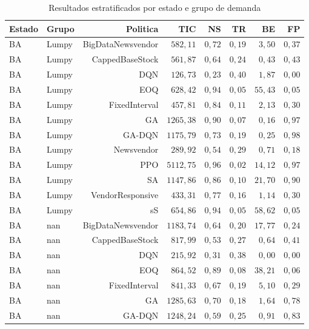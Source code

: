 \begin{table}[htb]
\centering
\caption{Resultados estratificados por estado e grupo de demanda}
\label{tab:kpis_stratified}
\begin{tabular}{llrrrrrr}
\toprule
Estado & Grupo & Politica & TIC & NS & TR & BE & FP \\
\midrule
BA & Lumpy & BigDataNewsvendor & $582{,}11$ & $0{,}72$ & $0{,}19$ & $3{,}50$ & $0{,}37$ \\
BA & Lumpy & CappedBaseStock & $561{,}87$ & $0{,}64$ & $0{,}24$ & $0{,}43$ & $0{,}43$ \\
BA & Lumpy & DQN & $126{,}73$ & $0{,}23$ & $0{,}40$ & $1{,}87$ & $0{,}00$ \\
BA & Lumpy & EOQ & $628{,}42$ & $0{,}94$ & $0{,}05$ & $55{,}43$ & $0{,}05$ \\
BA & Lumpy & FixedInterval & $457{,}81$ & $0{,}84$ & $0{,}11$ & $2{,}13$ & $0{,}30$ \\
BA & Lumpy & GA & $1265{,}38$ & $0{,}90$ & $0{,}07$ & $0{,}16$ & $0{,}97$ \\
BA & Lumpy & GA-DQN & $1175{,}79$ & $0{,}73$ & $0{,}19$ & $0{,}25$ & $0{,}98$ \\
BA & Lumpy & Newsvendor & $289{,}92$ & $0{,}54$ & $0{,}29$ & $0{,}71$ & $0{,}18$ \\
BA & Lumpy & PPO & $5112{,}75$ & $0{,}96$ & $0{,}02$ & $14{,}12$ & $0{,}97$ \\
BA & Lumpy & SA & $1147{,}86$ & $0{,}86$ & $0{,}10$ & $21{,}70$ & $0{,}90$ \\
BA & Lumpy & VendorResponsive & $433{,}31$ & $0{,}77$ & $0{,}16$ & $1{,}14$ & $0{,}30$ \\
BA & Lumpy & sS & $654{,}86$ & $0{,}94$ & $0{,}05$ & $58{,}62$ & $0{,}05$ \\
BA & nan & BigDataNewsvendor & $1183{,}74$ & $0{,}64$ & $0{,}20$ & $17{,}77$ & $0{,}24$ \\
BA & nan & CappedBaseStock & $817{,}99$ & $0{,}53$ & $0{,}27$ & $0{,}64$ & $0{,}41$ \\
BA & nan & DQN & $215{,}92$ & $0{,}31$ & $0{,}38$ & $0{,}00$ & $0{,}00$ \\
BA & nan & EOQ & $864{,}52$ & $0{,}89$ & $0{,}08$ & $38{,}21$ & $0{,}06$ \\
BA & nan & FixedInterval & $841{,}33$ & $0{,}67$ & $0{,}19$ & $5{,}10$ & $0{,}29$ \\
BA & nan & GA & $1285{,}63$ & $0{,}70$ & $0{,}18$ & $1{,}64$ & $0{,}78$ \\
BA & nan & GA-DQN & $1248{,}24$ & $0{,}59$ & $0{,}25$ & $0{,}91$ & $0{,}83$ \\

\end{tabular}
\end{table}
